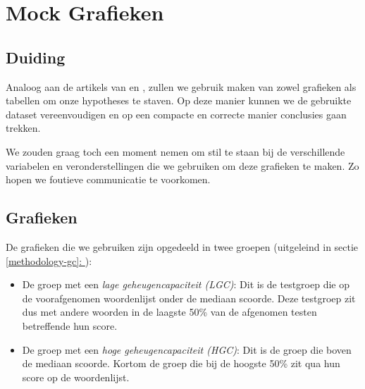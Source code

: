 \documentclass[12pt,a4paper]{article}
\newcommand{\customref}[1]{\underline{\ref{#1}: \nameref{#1}}}
\begin{document}
    \newpage
    \section{Mock Grafieken}
    
    	\subsection{Duiding}
    	
    	Analoog aan de artikels van \cite{HenryRoediger2006} en \cite{Agarwal2008}, zullen we gebruik maken van zowel grafieken als tabellen om onze hypotheses te staven. Op deze manier kunnen we de gebruikte dataset vereenvoudigen en op een compacte en correcte manier conclusies gaan trekken.\\
    	\par
    	\noindent
    	We zouden graag toch een moment nemen om stil te staan bij de verschillende variabelen en veronderstellingen die we gebruiken om deze grafieken te maken. Zo hopen we foutieve communicatie te voorkomen.
    	
    	\subsection{Grafieken}
    	
    	De grafieken die we gebruiken zijn opgedeeld in twee groepen (uitgeleind in sectie \customref{methodology-gc}):
    	\begin{itemize}
    		\item De groep met een \textit{lage geheugencapaciteit (LGC)}: Dit is de testgroep die op de voorafgenomen woordenlijst onder de mediaan scoorde. Deze testgroep zit dus met andere woorden in de laagste 50\% van de afgenomen testen betreffende hun score.
    		\item De groep met een \textit{hoge geheugencapaciteit (HGC)}: Dit is de groep die boven de mediaan scoorde. Kortom de groep die bij de hoogste 50\% zit qua hun score op de woordenlijst.
    	\end{itemize}
    
    	\newpage
\end{document}
